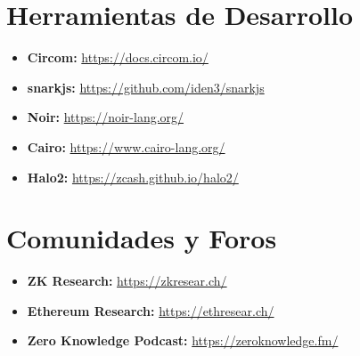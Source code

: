\documentclass[11pt,a4paper,twoside]{book}
\theoremstyle{definition}
\theoremstyle{remark}
\renewcommand{\cleardoublepage}{\clearpage}
\begin{document}
\section*{Herramientas de Desarrollo}

\begin{itemize}
    \item \textbf{Circom:} \url{https://docs.circom.io/}
    \item \textbf{snarkjs:} \url{https://github.com/iden3/snarkjs}
    \item \textbf{Noir:} \url{https://noir-lang.org/}
    \item \textbf{Cairo:} \url{https://www.cairo-lang.org/}
    \item \textbf{Halo2:} \url{https://zcash.github.io/halo2/}
\end{itemize}

\section*{Comunidades y Foros}

\begin{itemize}
    \item \textbf{ZK Research:} \url{https://zkresear.ch/}
    \item \textbf{Ethereum Research:} \url{https://ethresear.ch/}
    \item \textbf{Zero Knowledge Podcast:} \url{https://zeroknowledge.fm/}
\end{itemize}

\cleardoublepage
\end{document}
